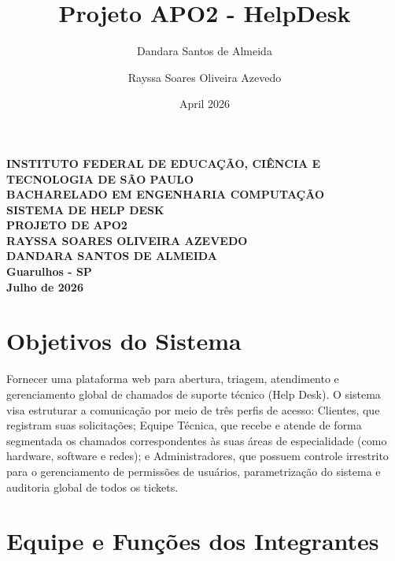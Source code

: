 \documentclass[a4paper, 12pt]{article}
\title{Projeto APO2 - HelpDesk}
\author{Dandara Santos de Almeida}
\author{Rayssa Soares Oliveira Azevedo}
\date{April 2026}
\begin{document}

\begin{titlepage}
    \begin{center}
        \Large\textbf{INSTITUTO FEDERAL DE EDUCAÇÃO, CIÊNCIA E TECNOLOGIA DE SÃO PAULO}\\[2cm]
        
        \large\textbf{BACHARELADO EM ENGENHARIA COMPUTAÇÃO}\\[4cm]

        \LARGE\textbf{SISTEMA DE HELP DESK}\\
        \large\textbf{PROJETO DE APO2}\\[2cm]

        \large\textbf{RAYSSA SOARES OLIVEIRA AZEVEDO}\\
        \large\textbf{DANDARA SANTOS DE ALMEIDA}\\[5cm]

        \vfill %
        \large\textbf{Guarulhos - SP}\\
        \large\textbf{Julho de 2026}
    \end{center}
    \thispagestyle{empty} %

\end{titlepage}




\newpage  %

\section{Objetivos do Sistema}

Fornecer uma plataforma web para abertura, triagem, atendimento e gerenciamento global de chamados de suporte técnico (Help Desk). O sistema visa estruturar a comunicação por meio de três perfis de acesso: Clientes, que registram suas solicitações; Equipe Técnica, que recebe e atende de forma segmentada os chamados correspondentes às suas áreas de especialidade (como hardware, software e redes); e Administradores, que possuem controle irrestrito para o gerenciamento de permissões de usuários, parametrização do sistema e auditoria global de todos os tickets.


\newpage  %
\section{Equipe e Funções dos Integrantes}
\end{document}
